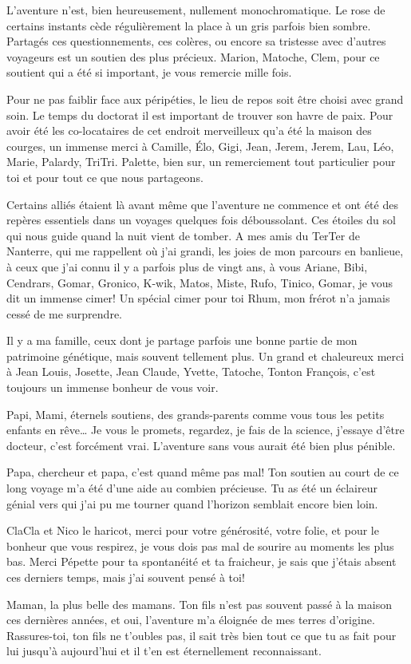 L'aventure n'est, bien heureusement, nullement monochromatique. Le rose
de certains instants cède régulièrement la place à un gris parfois bien
sombre. Partagés ces questionnements, ces colères, ou encore sa
tristesse avec d'autres voyageurs est un soutien des plus précieux.
Marion, Matoche, Clem, pour ce soutient qui a été si important, je vous
remercie mille fois.

Pour ne pas faiblir face aux péripéties, le lieu de repos soit être
choisi avec grand soin. Le temps du doctorat il est important de trouver
son havre de paix. Pour avoir été les co-locataires de cet endroit
merveilleux qu'a été la maison des courges, un immense merci à Camille,
Élo, Gigi, Jean, Jerem, Jerem, Lau, Léo, Marie, Palardy, TriTri.
Palette, bien sur, un remerciement tout particulier pour toi et pour
tout ce que nous partageons.

Certains alliés étaient là avant même que l'aventure ne commence et ont
été des repères essentiels dans un voyages quelques fois déboussolant.
Ces étoiles du sol qui nous guide quand la nuit vient de tomber. A mes
amis du TerTer de Nanterre, qui me rappellent où j'ai grandi, les joies
de mon parcours en banlieue, à ceux que j'ai connu il y a parfois plus
de vingt ans, à vous Ariane, Bibi, Cendrars, Gomar, Gronico, K-wik,
Matos, Miste, Rufo, Tinico, Gomar, je vous dit un immense cimer! Un
spécial cimer pour toi Rhum, mon frérot n'a jamais cessé de me
surprendre.

Il y a ma famille, ceux dont je partage parfois une bonne partie de mon
patrimoine génétique, mais souvent tellement plus. Un grand et
chaleureux merci à Jean Louis, Josette, Jean Claude, Yvette, Tatoche,
Tonton François, c'est toujours un immense bonheur de vous voir.

Papi, Mami, éternels soutiens, des grands-parents comme vous tous les
petits enfants en rêve\ldots{} Je vous le promets, regardez, je fais de
la science, j'essaye d'être docteur, c'est forcément vrai. L'aventure
sans vous aurait été bien plus pénible.

Papa, chercheur et papa, c'est quand même pas mal! Ton soutien au court
de ce long voyage m'a été d'une aide au combien précieuse. Tu as été un
éclaireur génial vers qui j'ai pu me tourner quand l'horizon semblait
encore bien loin.

ClaCla et Nico le haricot, merci pour votre générosité, votre folie, et
pour le bonheur que vous respirez, je vous dois pas mal de sourire au
moments les plus bas. Merci Pépette pour ta spontanéité et ta fraicheur,
je sais que j'étais absent ces derniers temps, mais j'ai souvent pensé à
toi!

Maman, la plus belle des mamans. Ton fils n'est pas souvent passé à la
maison ces dernières années, et oui, l'aventure m'a éloignée de mes
terres d'origine. Rassures-toi, ton fils ne t'oubles pas, il sait très
bien tout ce que tu as fait pour lui jusqu'à aujourd'hui et il t'en est
éternellement reconnaissant.
